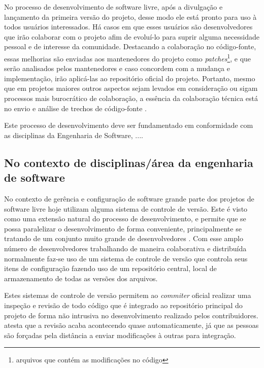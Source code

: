 No processo de desenvolvimento de software livre, após a divulgação e lançamento da primeira versão do projeto, desse modo ele está pronto para uso à todos usuários interessados. Há casos em que esses usuários são desenvolvedores que irão colaborar com o projeto afim de evoluí-lo para suprir alguma necessidade pessoal e de interesse da comunidade. Destacando a colaboração no código-fonte, essas melhorias são enviadas aos mantenedores do projeto como \textit{patches}\footnote{arquivos que contém as modificações no código}, e que serão analisados pelos mantenedores e caso concordem com a mudança e implementação, irão aplicá-las ao repositório oficial do projeto. Portanto, mesmo que em projetos maiores outros aspectos sejam levados em consideração ou sigam processos mais burocrático de colaboração, a essência da colaboração técnica está no envio e análise de trechos de código-fonte \cite{meirelles2013}.

Este processo de desenvolvimento deve ser fundamentado em conformidade com as disciplinas da Engenharia de Software, ....


\subsection{No contexto de disciplinas/área da engenharia de software}

No contexto de gerência e configuração de software grande parte dos projetos de software livre hoje utilizam alguma sistema de controle de versão. Este é visto como uma extensão natural do processo de desenvolvimento, e permite que se possa paralelizar o desenvolvimento de forma conveniente, principalmente se tratando de um conjunto muito grande de desenvolvedores \cite{reis2001caracterizaccao}. Com esse amplo número de desenvolvedores trabalhando de maneira colaborativa e distribuída normalmente faz-se uso de um sistema de controle de versão que controla seus itens de configuração fazendo uso de um repositório central, local de armazenamento de todas as versões dos arquivos.

Estes sistemas de controle de versão permitem ao \textit{commiter} oficial realizar uma inspeção e revisão de todo código que é integrado ao repositório principal do projeto de forma não intrusiva no desenvolvimento realizado pelos contribuidores.  atesta que a revisão acaba acontecendo quase automaticamente, já que as pessoas são forçadas pela distância a enviar modificações à outras para integração.

